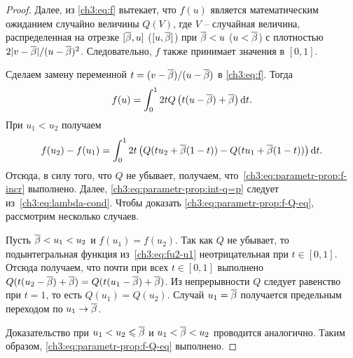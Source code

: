 {\begin{proof}
  Далее, из \eqref{ch3:eq:f} вытекает, что $f(u)$ является математическим ожиданием случайно величины $Q(V)$, где $V$ -- случайная величина, распределенная на отрезке $[{{\overline{\beta}}}, u]$ ($[u, {{\overline{\beta}}}]$) при ${{\overline{\beta}}} < u$ ($u < {{\overline{\beta}}}$) с плотностью $2|v-{{\overline{\beta}}}|/(u-{{\overline{\beta}}})^2$.
  Следовательно, $f$ также принимает значения в $[0, 1]$.

  Сделаем замену переменной $t = (v - {{\overline{\beta}}})/(u - {{\overline{\beta}}})$ в \eqref{ch3:eq:f}. Тогда
  \begin{equation*}
    f(u) = \int_0^1 2 t Q \left( t(u - {{\overline{\beta}}}) + {{\overline{\beta}}} \right) \mathop{}\!\mathrm{d} t.
  \end{equation*}
  При $u_1 < u_2$ получаем
  \begin{equation}
    \label{ch3:eq:fu2-u1}
    f(u_2) - f(u_1) =
    \int_0^1 2t \left( 
      Q(t u_2 + {{\overline{\beta}}}(1-t)) - Q(t u_1 + {{\overline{\beta}}} (1-t))
    \right) \mathop{}\!\mathrm{d} t.
  \end{equation}
  Отсюда, в силу того, что $Q$ не убывает, получаем, что~\eqref{ch3:eq:parametr-prop:f-incr} выполнено.
  Далее, \eqref{ch3:eq:parametr-prop:int-q=p} следует из~\eqref{ch3:eq:lambda-cond}.
  Чтобы доказать \eqref{ch3:eq:parametr-prop:f-Q-eq}, рассмотрим несколько случаев.

  Пусть ${{\overline{\beta}}} < u_1 < u_2$ и $f(u_1) = f(u_2)$.
  Так как $Q$ не убывает, то подынтегральная функция из~\eqref{ch3:eq:fu2-u1} неотрицательная при $t \in [0, 1]$. 
  Отсюда получаем, что почти при всех $t \in [0, 1]$ выполнено $ Q(t(u_2 - {{\overline{\beta}}}) + {{\overline{\beta}}}) = Q(t(u_1 - {{\overline{\beta}}}) + {{\overline{\beta}}})$.
  Из непрерывности $Q$ следует равенство при $t = 1$, то есть $Q(u_1) = Q(u_2)$.
  Случай $u_1 = {{\overline{\beta}}}$ получается предельным переходом по $u_1 \rightarrow {{\overline{\beta}}}$.

  Доказательство при $u_1 < u_2 \leqslant {{\overline{\beta}}}$ и $u_1 < {{\overline{\beta}}} < u_2$ проводится аналогично.
  Таким образом, \eqref{ch3:eq:parametr-prop:f-Q-eq} выполнено.
\end{proof}

}
